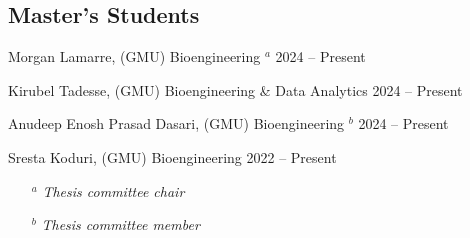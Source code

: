 \documentclass[letterpaper, 10pt]{article}
\begin{document}
\subsection{\textbf{Master's Students}}
\begin{compacthang}
     \item Morgan Lamarre, (GMU) Bioengineering $^{a}$ \hfill 2024 -- Present
	\item Kirubel Tadesse, (GMU) Bioengineering \& Data Analytics \hfill 2024 -- Present
     \item Anudeep Enosh Prasad Dasari, (GMU) Bioengineering $^{b}$ \hfill 2024 -- Present
	\item Sresta Koduri, (GMU) Bioengineering \hfill 2022 -- Present
     \begin{itemize}
	     \item[$^{a}$] \textit{Thesis committee chair}
	     \item[$^{b}$] \textit{Thesis committee member}
     \end{itemize}	
\end{compacthang}

\end{document}
